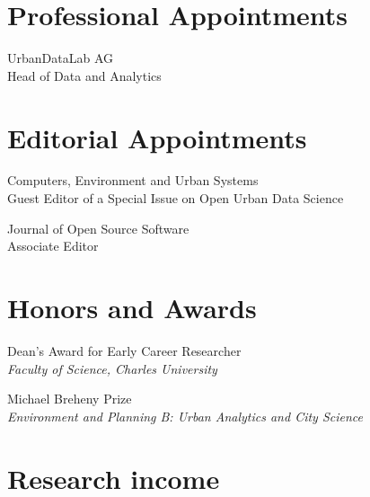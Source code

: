 \documentclass[12pt,a4paper]{report}
\begin{document}
    \section*{Professional Appointments}

    \begin{tablist}

        \item[2022--23] \tab{}UrbanDataLab AG \\
                            Head of Data and Analytics \\

    \end{tablist}

    \section*{Editorial Appointments}

    \begin{tablist}

        \item[2025--26] \tab{}Computers, Environment and Urban Systems\\
                            Guest Editor of a Special Issue on Open Urban Data Science

        \item[2021--] \tab{}Journal of Open Source Software \\
                            Associate Editor

    \end{tablist}

    \section*{Honors and Awards}

    \begin{tablist}

        \item[2024] \tab{}Dean's Award for Early Career Researcher \\
            \textit{Faculty of Science, Charles University}
        \item[2023] \tab{}Michael Breheny Prize \\
                    \textit{Environment and Planning B: Urban Analytics and City Science}

    \end{tablist}

    \section*{Research income}
\end{document}

